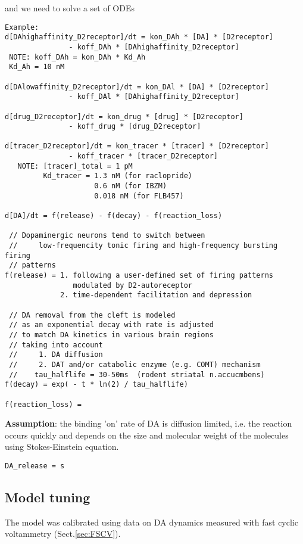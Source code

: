and we need to solve a set of ODEs
\begin{verbatim}
Example:
d[DAhighaffinity_D2receptor]/dt = kon_DAh * [DA] * [D2receptor] 
               - koff_DAh * [DAhighaffinity_D2receptor]
 NOTE: koff_DAh = kon_DAh * Kd_Ah
 Kd_Ah = 10 nM

d[DAlowaffinity_D2receptor]/dt = kon_DAl * [DA] * [D2receptor] 
               - koff_DAl * [DAhighaffinity_D2receptor]

d[drug_D2receptor]/dt = kon_drug * [drug] * [D2receptor] 
               - koff_drug * [drug_D2receptor]

d[tracer_D2receptor]/dt = kon_tracer * [tracer] * [D2receptor] 
               - koff_tracer * [tracer_D2receptor]
   NOTE: [tracer]_total = 1 pM
         Kd_tracer = 1.3 nM (for raclopride)
                     0.6 nM (for IBZM)
                     0.018 nM (for FLB457)

d[DA]/dt = f(release) - f(decay) - f(reaction_loss)

 // Dopaminergic neurons tend to switch between 
 //     low-frequencity tonic firing and high-frequency bursting firing
 // patterns
f(release) = 1. following a user-defined set of firing patterns
                modulated by D2-autoreceptor
             2. time-dependent facilitation and depression
                
 // DA removal from the cleft is modeled
 // as an exponential decay with rate is adjusted
 // to match DA kinetics in various brain regions 
 // taking into account 
 //     1. DA diffusion
 //     2. DAT and/or catabolic enzyme (e.g. COMT) mechanism   
 //    tau_halflife = 30-50ms  (rodent striatal n.accucmbens)
f(decay) = exp( - t * ln(2) / tau_halflife)

f(reaction_loss) = 
\end{verbatim}

{\bf Assumption}: the binding 'on' rate of DA is diffusion limited, i.e. the
reaction occurs quickly and depends on the size and molecular weight of the
molecules using Stokes-Einstein equation. 

\begin{verbatim}
DA_release = s
\end{verbatim}

\subsection{Model tuning}

The model was calibrated using data on DA dynamics measured with fast cyclic
voltammetry (Sect.\ref{sec:FSCV}).


